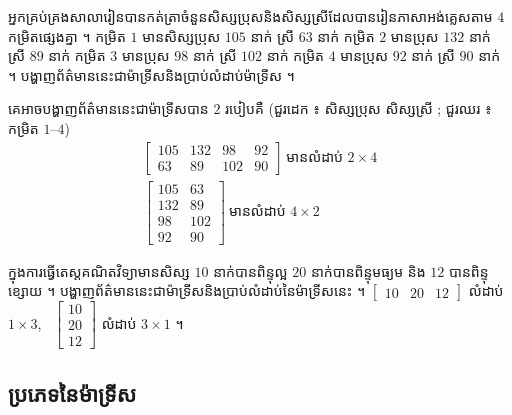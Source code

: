 \begin{example}[លំហាត់គំរូ ១]
អ្នកគ្រប់គ្រងសាលារៀនបានកត់ត្រាចំនួនសិស្សប្រុសនិងសិស្សស្រីដែលបានរៀនភាសាអង់គ្លេសតាម $4$ កម្រិតផ្សេងគ្នា ។ កម្រិត $1$ មានសិស្សប្រុស $105$ នាក់ ស្រី $63$ នាក់ កម្រិត $2$ មានប្រុស $132$ នាក់ ស្រី $89$ នាក់ កម្រិត $3$ មានប្រុស $98$ នាក់ ស្រី $102$ នាក់ កម្រិត $4$ មានប្រុស $92$ នាក់ ស្រី $90$ នាក់ ។ បង្ហាញព័ត៌មាននេះជាម៉ាទ្រីសនិងប្រាប់លំដាប់ម៉ាទ្រីស ។
\end{example}
\ans
គេអាចបង្ហាញព័ត៌មាននេះជាម៉ាទ្រីសបាន $2$ របៀបគឺ (ជួរដេក ៖ សិស្សប្រុស សិស្សស្រី ; ជួរឈរ ៖ កម្រិត $1$–$4$)
\[
\begin{gathered}
\begin{bmatrix} 105 & 132 & 98 & 92\\ 63 & 89 & 102 & 90 \end{bmatrix} \ \text{មានលំដាប់ } 2 \times 4\\
\begin{bmatrix} 105 & 63\\ 132 & 89\\ 98 & 102\\ 92 & 90 \end{bmatrix} \ \text{មានលំដាប់ } 4 \times 2
\end{gathered}
\]

\begin{pro}
ក្នុងការធ្វើតេស្តគណិតវិទ្យាមានសិស្ស $10$ នាក់បានពិន្ទុល្អ $20$ នាក់បានពិន្ទុមធ្យម និង $12$ បានពិន្ទុខ្សោយ ។ បង្ហាញព័ត៌មាននេះជាម៉ាទ្រីសនិងប្រាប់លំដាប់នៃម៉ាទ្រីសនេះ ។
\ans
$\begin{bmatrix} 10 & 20 & 12 \end{bmatrix}$ លំដាប់ $1 \times 3$, \ $\begin{bmatrix} 10\\ 20\\ 12 \end{bmatrix}$ លំដាប់ $3 \times 1$ ។
\end{pro}

\subsection{ប្រភេទនៃម៉ាទ្រីស}

